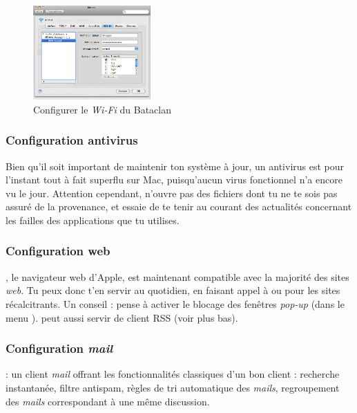 \begin{figure}[p]
    \begin{center}
      \includegraphics[width=0.4\textwidth]{images/mac_config_wifi.png} 
      \caption{Configurer le \emph{Wi-Fi} du Bataclan}
      \label{wifi:mac:bataclan}
    \end{center}
  \end{figure}


\subsubsection{Configuration antivirus}

Bien qu'il soit important de maintenir ton système à jour, un antivirus est pour l'instant tout à fait superflu sur Mac, puisqu'aucun virus fonctionnel n'a encore vu le jour. Attention cependant, n'ouvre pas des fichiers dont tu ne te sois pas assuré de la provenance, et essaie de te tenir au courant des actualités concernant les failles des applications que tu utilises.



\subsubsection{Configuration web}

, le navigateur web d'Apple, est maintenant compatible avec la majorité des sites \emph{web}. Tu peux donc t'en servir au quotidien, en faisant appel à  ou  pour les sites récalcitrants. Un conseil : pense à activer le blocage des fenêtres \emph{pop-up} (dans le menu ).  peut aussi servir de client RSS (voir plus bas).\\


\subsubsection{Configuration \emph{mail}}
  : un client \emph{mail} offrant les fonctionnalités classiques d'un bon client : recherche instantanée, filtre antispam, règles de tri automatique des \emph{mails}, regroupement des \emph{mails} correspondant à une même discussion.

